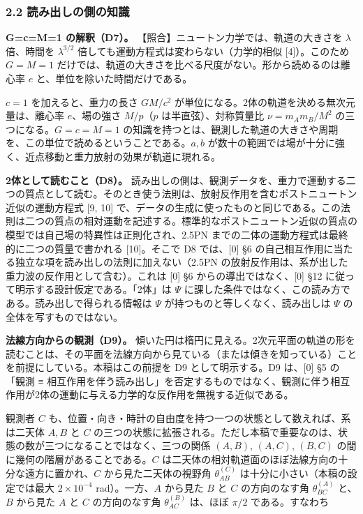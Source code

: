 \documentclass[
  a4paper,
]{ltjsarticle}
\begin{document}
\subsubsection{2.2
読み出しの側の知識}\label{ux8aadux307fux51faux3057ux306eux5074ux306eux77e5ux8b58}

\textbf{G=c=M=1 の解釈（D7）。}
【照合】ニュートン力学では、軌道の大きさを \(\lambda\) 倍、時間を
\(\lambda^{3/2}\) 倍しても運動方程式は変わらない（力学的相似
{[}4{]}）。このため \(G=M=1\)
だけでは、軌道の大きさを比べる尺度がない。形から読めるのは離心率 \(e\)
と、単位を除いた時間だけである。

\(c=1\) を加えると、重力の長さ \(GM/c^2\)
が単位になる。2体の軌道を決める無次元量は、離心率 \(e\)、場の強さ
\(M/p\)（\(p\) は半直弦）、対称質量比 \(\nu=m_Am_B/M^2\)
の三つになる。\(G=c=M=1\)
の知識を持つとは、観測した軌道の大きさや周期を、この単位で読めるということである。\(a, b\)
が数十の範囲では場が十分に強く、近点移動と重力放射の効果が軌道に現れる。

\textbf{2体として読むこと（D8）。}
読み出しの側は、観測データを、重力で運動する二つの質点として読む。そのとき使う法則は、放射反作用を含むポストニュートン近似の運動方程式
{[}9, 10{]}
で、データの生成に使ったものと同じである。この法則は二つの質点の相対運動を記述する。標準的なポストニュートン近似の質点の模型では自己場の特異性は正則化され、2.5PN
までの二体の運動方程式は最終的に二つの質量で書かれる {[}10{]}。そこで D8
では、{[}0{]} §6
の自己相互作用に当たる独立な項を読み出しの法則に加えない（2.5PN
の放射反作用は、系が出した重力波の反作用として含む）。これは {[}0{]} §6
からの導出ではなく、{[}0{]} §12
に従って明示する設計仮定である。「2体」は \(\Psi\)
に課した条件ではなく、この読み方である。読み出しで得られる情報は
\(\Psi\) が持つものと等しくなく、読み出しは \(\Psi\)
の全体を写すものではない。

\textbf{法線方向からの観測（D9）。}
傾いた円は楕円に見える。2次元平面の軌道の形を読むことは、その平面を法線方向から見ている（または傾きを知っている）ことを前提にしている。本稿はこの前提を
D9 として明示する。D9 は、{[}0{]} §5 の「観測 ≡
相互作用を伴う読み出し」を否定するものではなく、観測に伴う相互作用が2体の運動に与える力学的な反作用を無視する近似である。

観測者 \(C\)
も、位置・向き・時計の自由度を持つ一つの状態として数えれば、系は二天体
\(A, B\) と \(C\)
の三つの状態に拡張される。ただし本稿で重要なのは、状態の数が三つになることではなく、三つの関係
\((A,B)\), \((A,C)\), \((B,C)\) の間に幾何の階層があることである。\(C\)
は二天体の相対軌道面のほぼ法線方向の十分な遠方に置かれ、\(C\)
から見た二天体の視野角 \(\theta_{AB}^{(C)}\)
は十分に小さい（本稿の設定では最大 \(2\times10^{-4}\) rad）。一方、\(A\)
から見た \(B\) と \(C\) の方向のなす角 \(\theta_{BC}^{(A)}\) と、\(B\)
から見た \(A\) と \(C\) の方向のなす角 \(\theta_{AC}^{(B)}\) は、ほぼ
\(\pi/2\) である。すなわち
\end{document}
